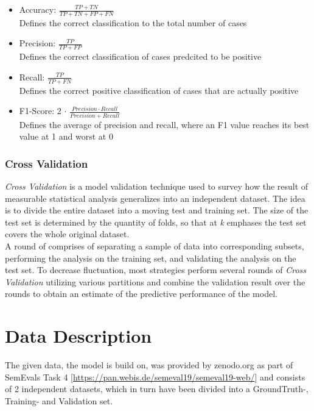 \documentclass[a4paper, 11pt,titlepage,oneside,openany]{book}
\begin{document}
\begin{itemize}
	\item Accuracy: $\frac{TP+TN}{TP+TN+FP+FN}$\\
					Defines the correct classification to the total number of cases
	\item Precision: $\frac{TP}{TP+FP}$\\
	Defines the correct classification of cases predcited to be positive
	\item Recall: $\frac{TP}{TP+FN}$\\
	Defines the correct positive classification of cases that are actually positive
	\item F1-Score: 2 $\cdot$ $\frac{Precision \cdot Recall}{Precision+Recall}$\\
	Defines the average of precision and recall,
	where an F1 value reaches its best value at 1
	and worst at 0
\end{itemize}

\subsection{Cross Validation}
\textit{Cross Validation} is a model validation technique used to survey how the result of measurable statistical analysis generalizes into an independent dataset. The idea is to divide the entire dataset into a moving test and training set. The size of the test set is determined by the quantity of folds, so that at \textit{k} emphases the test set covers the whole original dataset.\\
\noindent A round of  comprises of separating a sample of data into corresponding subsets, performing the analysis on the training set, and validating the analysis on the test set. To decrease fluctuation, most strategies perform several rounds of \textit{Cross Validation} utilizing various partitions and combine the validation result over the rounds to obtain an estimate of the predictive performance of the model.


\chapter{Data Description}
 The given data, the model is build on, was provided by zenodo.org as part of SemEvals Task 4 [\url{https://pan.webis.de/semeval19/semeval19-web/}] and consists of 2 independent datasets, which in turn have been divided into a GroundTruth-, Training- and Validation set.
 
\end{document}
